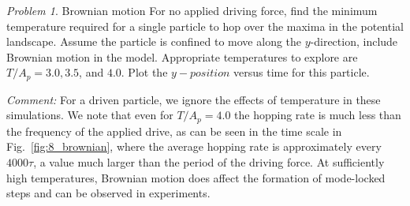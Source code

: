 \documentclass[preprint,showpacs,preprintnumbers,amsmath,amssymb,aps,prb]{revtex4-1}
\theoremstyle{remark}
\newtheorem{problem}{Problem}
\begin{document}
\begin{problem}{Brownian motion}
  For no applied driving force,
  find 
  the minimum temperature required for a single particle
  to hop over the maxima in the potential landscape.
  Assume the particle is confined to
  move along the $y$-direction,
  include Brownian motion 
  in the model.
  Appropriate temperatures to explore
  are $T/A_p = 3.0, 3.5$, and $4.0$.
  Plot the $y-position$ versus time
  for this particle.
%  

  {\it Comment: } For a driven particle,
  we ignore 
  the effects of temperature 
  in these simulations.  
  We note that even for $T/A_p = 4.0$ 
  the hopping rate
  is much less than the
  frequency of the applied drive, as
 can be seen in the time scale in Fig.~\ref{fig:8_brownian},
  where the average hopping rate is approximately
  every $4000\tau$,
  a value much larger than the period of the driving force.  
  At sufficiently high temperatures,
  Brownian motion does affect 
  the formation of mode-locked steps
  and can be observed in experiments.
\end{problem}
\end{document}
